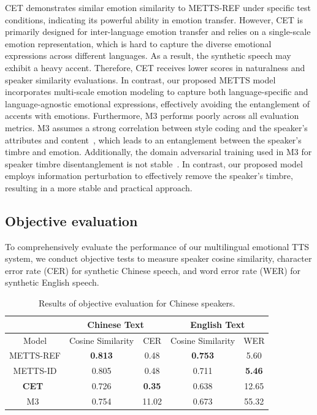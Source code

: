 \documentclass[journal,comsoc]{IEEEtran}
\begin{document}
CET demonstrates similar emotion similarity to METTS-REF under specific test conditions, indicating its powerful ability in emotion transfer. However, CET is primarily designed for inter-language emotion transfer and relies on a single-scale emotion representation, which is hard to capture the diverse emotional expressions across different languages. As a result, the synthetic speech may exhibit a heavy accent. Therefore, CET receives lower scores in naturalness and speaker similarity evaluations. In contrast, our proposed METTS model incorporates multi-scale emotion modeling to capture both language-specific and language-agnostic emotional expressions, effectively avoiding the entanglement of accents with emotions.
Furthermore, M3 performs poorly across all evaluation metrics. M3 assumes a strong correlation between style coding and the speaker's attributes and content~\cite{DBLP:conf/interspeech/ShangHZZ021}, which leads to an entanglement between the speaker's timbre and emotion. Additionally, the domain adversarial training used in M3 for speaker timbre disentanglement is not stable~\cite{DBLP:conf/iclr/AcunaLZF22}. In contrast, our proposed model employs information perturbation to effectively remove the speaker's timbre, resulting in a more stable and practical approach.


\subsection{Objective evaluation}
\label{sc:emotrans}

To comprehensively evaluate the performance of our multilingual emotional TTS system, we conduct objective tests to measure speaker cosine similarity, character error rate (CER) for synthetic Chinese speech, and word error rate (WER) for synthetic English speech.

\begin{table}[htb!]
\centering
\caption{Results of objective evaluation for Chinese speakers.}
\label{tab_7}
\begin{tabular}{@{}c|cc|cc@{}}
\toprule
                             & \multicolumn{2}{c|}{Chinese Text} & \multicolumn{2}{c}{English Text} \\ \midrule
Model                        & Cosine Similarity                & CER          & Cosine Similarity             & WER            \\ \midrule
METTS-REF  & \textbf{0.813} & 0.48          & \textbf{0.753}  & 5.60                  \\
METTS-ID & 0.805          & 0.48          & 0.711  & \textbf{5.46} \\
\textbf{CET}~\cite{DBLP:journals/corr/abs-2110-04153}  & 0.726          & \textbf{0.35} & 0.638   & 12.65                 \\
M3~\cite{DBLP:conf/interspeech/ShangHZZ021}  & 0.754          & 11.02         & 0.673  & 55.32                 \\ \bottomrule
\end{tabular}
\end{table}
\end{document}
